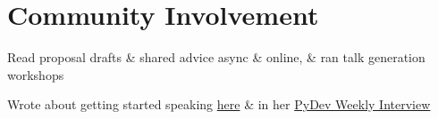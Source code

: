 \documentclass[letterpaper]{deedy-resume} %
\begin{document}
\begin{minipage}[t]{0.66\textwidth}
\sectionspace %
%
%


\section{Community Involvement}

%
\begin{tightitemize}
\item Read proposal drafts \& shared advice async \& online, \& ran talk generation workshops
\item Wrote about getting started speaking \href{}{here} \& in her \href{}{PyDev Weekly Interview} 
\end{tightitemize}
%
\sectionspace %


\end{minipage}
\end{document}
